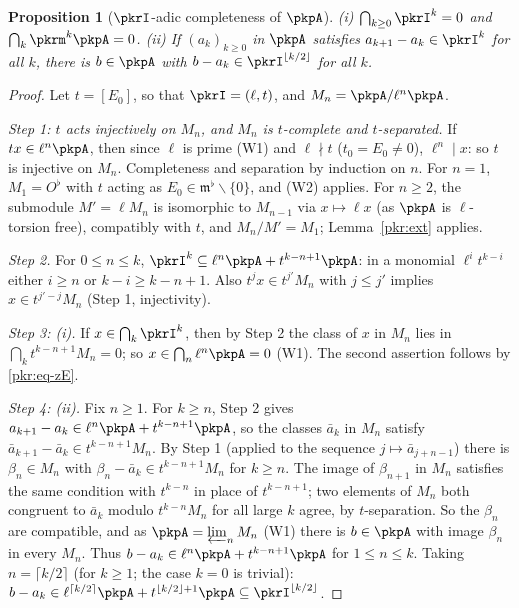 \documentclass[10pt]{amsart}
\newtheorem{proposition}[theorem]{Proposition}
\theoremstyle{definition}
\theoremstyle{remark}
\begin{document}
\begin{proposition}[$\pkrI$-adic completeness of $\pkpA$]\label{pkr:complete}
(i) $\bigcap_{k\ge0}\pkrI^k=0$ and $\bigcap_k\pkrm^k\pkpA=0$.
(ii) If $(a_k)_{k\ge0}$ in $\pkpA$ satisfies $a_{k+1}-a_k\in\pkrI^k$ for all $k$, there is $b\in\pkpA$
with $b-a_k\in\pkrI^{\lfloor k/2\rfloor}$ for all $k$.
\end{proposition}

\begin{proof}
Let $t=[E_0]$, so that $\pkrI=(\ell,t)$, and $M_n=\pkpA/\ell^n\pkpA$.

\emph{Step 1: $t$ acts injectively on $M_n$, and $M_n$ is $t$-complete and $t$-separated.} If
$tx\in\ell^n\pkpA$, then since $\ell$ is prime (W1) and $\ell\nmid t$ ($t_0=E_0\ne0$), $\ell^n\mid x$: so
$t$ is injective on $M_n$. Completeness and separation by induction on $n$. For $n=1$, $M_1=O^\flat$
with $t$ acting as $E_0\in\mathfrak m^\flat\smallsetminus\{0\}$, and (W2) applies. For $n\ge2$, the
submodule $M'=\ell M_n$ is isomorphic to $M_{n-1}$ via $x\mapsto\ell x$ (as $\pkpA$ is $\ell$-torsion
free), compatibly with $t$, and $M_n/M'=M_1$; Lemma~\ref{pkr:ext} applies.

\emph{Step 2.} For $0\le n\le k$, $\pkrI^k\subseteq\ell^n\pkpA+t^{k-n+1}\pkpA$: in a monomial $\ell^it^{k-i}$
either $i\ge n$ or $k-i\ge k-n+1$. Also $t^jx\in t^{j'}M_n$ with $j\le j'$ implies $x\in t^{j'-j}M_n$
(Step 1, injectivity).

\emph{Step 3: (i).} If $x\in\bigcap_k\pkrI^k$, then by Step 2 the class of $x$ in $M_n$ lies in
$\bigcap_kt^{k-n+1}M_n=0$; so $x\in\bigcap_n\ell^n\pkpA=0$ (W1). The second assertion follows by
\eqref{pkr:eq-zE}.

\emph{Step 4: (ii).} Fix $n\ge1$. For $k\ge n$, Step 2 gives $a_{k+1}-a_k\in\ell^n\pkpA+t^{k-n+1}\pkpA$,
so the classes $\bar a_{k}$ in $M_n$ satisfy $\bar a_{k+1}-\bar a_k\in t^{k-n+1}M_n$. By Step 1 (applied
to the sequence $j\mapsto\bar a_{j+n-1}$) there is $\beta_n\in M_n$ with $\beta_n-\bar a_k\in
t^{k-n+1}M_n$ for $k\ge n$. The image of $\beta_{n+1}$ in $M_n$ satisfies the same condition with
$t^{k-n}$ in place of $t^{k-n+1}$; two elements of $M_n$ both congruent to $\bar a_k$ modulo
$t^{k-n}M_n$ for all large $k$ agree, by $t$-separation. So the $\beta_n$ are compatible, and as
$\pkpA=\varprojlim_n M_n$ (W1) there is $b\in\pkpA$ with image $\beta_n$ in every $M_n$. Thus $b-a_k\in
\ell^n\pkpA+t^{k-n+1}\pkpA$ for $1\le n\le k$. Taking $n=\lceil k/2\rceil$ (for $k\ge1$; the case $k=0$
is trivial): $b-a_k\in\ell^{\lceil k/2\rceil}\pkpA+t^{\lfloor k/2\rfloor+1}\pkpA\subseteq\pkrI^{\lfloor
k/2\rfloor}$.
\end{proof}
\end{document}

